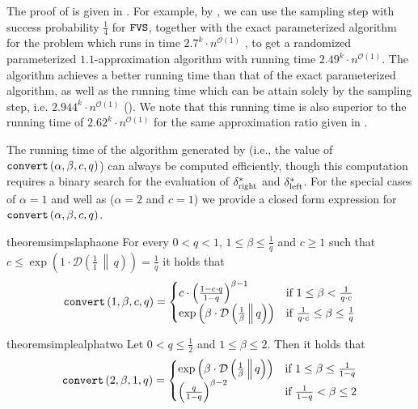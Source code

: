 \documentclass[letterpaper,11pt]{article}
\newcommand{\1}[1]{\mathds{1}\left[#1\right]}
\newcommand{\runtime}[1][\alpha, \beta, c, q]{\textnormal{\texttt{convert}}\left(#1\right)}
\newcommand{\D}[2]{\mathcal{D}\left(#1\, \middle\|\,#2 \right)}
\newcommand{\Oh}{\mathcal{O}}
\newcommand{\FVS}{\textnormal{\texttt{FVS}}\xspace}
\newcommand{\sdeltal}{\delta^{*}_{\textnormal{left}}}
\newcommand{\sdeltar}{\delta^{*}_{\textnormal{right}}}
\begin{document}
The proof of  is given in . 
For example, by , we can use the sampling step with success probability $\frac{1}{4}$ for $\FVS$, together with the exact parameterized algorithm for the problem which runs in time $2.7^k\cdot n^{\Oh(1)}$ \cite{liDetectingFeedbackVertex2022}, to get a randomized parameterized $1.1$-approximation algorithm with running time $2.49^k \cdot n^{\Oh(1)}$. The algorithm achieves a better running time than that of the exact parameterized algorithm, as well as the running time which can be attain solely by the sampling step, i.e. $2.944^{k} \cdot n^{\Oh(1)}$ (). We note that this running time is also superior to the running time of $2.62^{k}\cdot n^{\Oh(1)}$ for the same approximation ratio given in \cite{janaParameterizedApproximationScheme2023}. 

The running time of the algorithm generated by   (i.e., the value of $\runtime$) can always be computed efficiently, though this computation requires a binary search for the evaluation of $\sdeltar$ and $\sdeltal$. For the special cases of $\alpha =1$ and well as ($\alpha=2$ and $c=1$) we  provide a closed form expression for $\runtime$. 
\begin{restatable}[simple formula for $\alpha=1$]{theorem}{simpslaphaone}
\label{theorem:summary_sampling_step_alpha_1}
For every   $0 < q < 1$, $1 \leq \beta \leq \frac{1}{q}$ and $c \geq 1$ such that $c \leq \exp\left(1\cdot \D{\frac{1}{1}}{q}\right)  = \frac{1}{q}$ it holds that
\begin{equation*}
	\runtime[1,\beta,c,q] = \begin{cases}
		c \cdot \left( \frac{1 - c \cdot q}{1 - q} \right)^{\beta - 1} &\text{if } 1 \leq \beta < \frac{1}{q \cdot c}\\ 
		\exp\left( \beta \cdot \D{\frac{1}{\beta}}{q} \right) &\text{if } \frac{1}{q \cdot c} \leq \beta \leq \frac{1}{q} 
	\end{cases}
\end{equation*}
\end{restatable}


\begin{restatable}[simple formula for $\alpha =2$ and $c=1$]{theorem}{simplealphatwo}
	\label{theorem:summary_sampling_step_alpha_2}
	Let $0 < q \leq \frac{1}{2}$ and  $1 \leq \beta \leq 2$.
	Then it holds that 
	\begin{equation*}
		\runtime[2,\beta,1,q] = \begin{cases}
			\exp\left( \beta \cdot \D{\frac{1}{\beta}}{q} \right) &\text{if } 1 \leq \beta \leq \frac{1}{1 - q}\\
			\left( \frac{q}{1 - q} \right)^{\beta - 2}  &\text{if } \frac{1}{1 - q} < \beta \leq 2\\
		\end{cases}
	\end{equation*}
\end{restatable}
\end{document}
